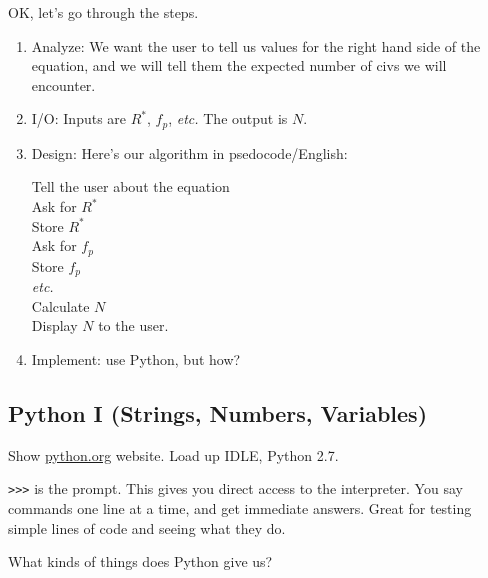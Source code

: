 \documentclass{article}
\newcommand{\etc}{\emph{etc.}\xspace}
\begin{document}
OK, let's go through the steps.

\begin{enumerate}
\item Analyze: We want the user to tell us values for the right hand
  side of the equation, and we will tell them the expected number of
  civs we will encounter.

\item I/O: Inputs are $R^*$, $f_p$, \etc  The output is $N$.

\item Design: Here's our algorithm in psedocode/English:

  Tell the user about the equation \\
  Ask for $R^*$ \\
  Store $R^*$ \\
  Ask for $f_p$ \\
  Store $f_p$ \\
  \etc \\
  Calculate $N$ \\
  Display $N$ to the user.

\item Implement: use Python, but how?

\end{enumerate}

\subsection*{Python I (Strings, Numbers, Variables)}

Show \url{python.org} website.  Load up IDLE, Python 2.7.

\texttt{>>>} is the prompt.  This gives you direct access to the
interpreter.  You say commands one line at a time, and get immediate
answers.  Great for testing simple lines of code and seeing what they
do.

What kinds of things does Python give us?
\end{document}
